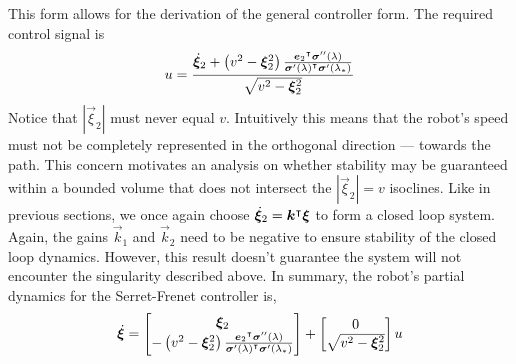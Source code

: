 \documentclass[oneside, 11pt]{book}
\begin{document}
This form allows for the derivation of the general controller form. The required control signal is
\begin{equation*}
    u = \frac{\dot{\bm{\xi}}_2 + \left(v^2 - \bm{\xi}_2^2\right) \frac{{\bm{e}_2}^{\intercal}\bm{\sigma}''(\lambda)}{{\bm{\sigma}'(\lambda)}^{\intercal}\bm{\sigma}'(\lambda_*)}}{\sqrt{v^2 - \bm{\xi}_2^2}}
\end{equation*}
Notice that $\left|\vec{\xi}_2\right|$ must never equal $v$. Intuitively this means that the robot's speed must not be completely represented in the orthogonal direction --- towards the path. This concern motivates an analysis on whether stability may be guaranteed within a bounded volume that does not intersect the $\left|\vec{\xi}_2\right|=v$ isoclines. Like in previous sections, we once again choose $\dot{\bm{\xi}}_2 = {\bm{k}}^{\intercal}\bm{\xi}$ to form a closed loop system. Again, the gains $\vec{k}_1$ and $\vec{k}_2$ need to be negative to ensure stability of the closed loop dynamics. However, this result doesn't guarantee the system will not encounter the singularity described above. In summary, the robot's partial dynamics for the Serret-Frenet controller is,
\begin{equation*}
    \dot{\bm{\xi}} =
        \begin{bmatrix}
            \bm{\xi}_2 \\
            -\left(v^2 - \bm{\xi}_2^2\right) \frac{{\bm{e}_2}^{\intercal}\bm{\sigma}''(\lambda)}{{\bm{\sigma}'(\lambda)}^{\intercal}\bm{\sigma}'(\lambda_*)}
        \end{bmatrix}
        +
        \begin{bmatrix}
            0 \\
            \sqrt{v^2 - \bm{\xi}_2^2}
        \end{bmatrix}
        u
\end{equation*}
\end{document}

